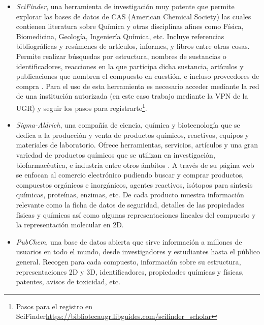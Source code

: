 \begin{itemize}
    \item \emph{SciFinder}, una herramienta de investigación muy potente que permite explorar las bases de datos de CAS (American Chemical Society) las cuales contienen literatura sobre Química y otras disciplinas afines como Física, Biomedicina, Geología, Ingeniería Química, etc. Incluye referencias bibliográficas y resúmenes de artículos, informes, y libros entre otras cosas. Permite realizar búsquedas por estructura, nombres de sustancias o identificadores, reacciones en la que participa dicha sustancia, artículos y publicaciones que nombren el compuesto en cuestión, e incluso proveedores de compra \cite{scifinder_website}. Para el uso de esta herramienta es necesario acceder mediante la red de una institución autorizada (en este caso trabajo mediante la VPN de la UGR) y seguir los pasos para registrarte\footnote{Pasos para el registro en SciFinder\url{https://bibliotecaugr.libguides.com/scifinder_scholar}}.

    \item \emph{Sigma-Aldrich}, una compañía de ciencia, química y biotecnología que se dedica a la producción y venta de productos químicos, reactivos, equipos y materiales de laboratorio. Ofrece herramientas, servicios, artículos y una gran variedad de productos químicos que se utilizan en investigación, biofarmacéutica, e industria entre otros ámbitos \cite{sigma_aldrich_web}. A través de su página web se enfocan al comercio electrónico pudiendo buscar y comprar productos, compuestos orgánicos e inorgánicos, agentes reactivos, isótopos para síntesis químicas, proteínas, enzimas, etc. De cada producto muestra información relevante como la ficha de datos de seguridad, detalles de las propiedades físicas y químicas así como algunas representaciones lineales del compuesto y la representación molecular en 2D.
    
    \item \emph{PubChem}, una base de datos abierta que sirve información a millones de usuarios en todo el mundo, desde investigadores y estudiantes hasta el público general. Recogen para cada compuesto, información sobre su estructura, representaciones 2D y 3D, identificadores, propiedades químicas y físicas, patentes, avisos de toxicidad, etc. \cite{pubchem_website} 
\end{itemize}
    
